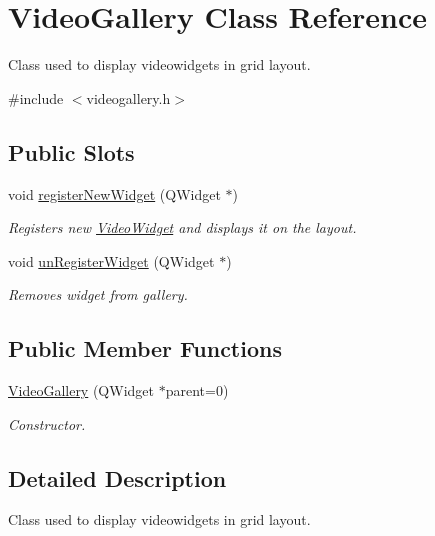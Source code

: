 \hypertarget{class_video_gallery}{
\section{VideoGallery Class Reference}
\label{dc/d09/class_video_gallery}
}


Class used to display videowidgets in grid layout.  




{\ttfamily \#include $<$videogallery.h$>$}

\subsection*{Public Slots}
\begin{DoxyCompactItemize}
\item 
void \hyperlink{class_video_gallery_ad25f124c9bf433bdaa104f9638c59399}{registerNewWidget} (QWidget $\ast$)
\begin{DoxyCompactList}\small\item\em Registers new \hyperlink{class_video_widget}{VideoWidget} and displays it on the layout. \item\end{DoxyCompactList}\item 
void \hyperlink{class_video_gallery_a1be90e78200e971b1b357aa342c23b3e}{unRegisterWidget} (QWidget $\ast$)
\begin{DoxyCompactList}\small\item\em Removes widget from gallery. \item\end{DoxyCompactList}\end{DoxyCompactItemize}
\subsection*{Public Member Functions}
\begin{DoxyCompactItemize}
\item 
\hyperlink{class_video_gallery_aa20be933d1bfef5e9533ea255afc8142}{VideoGallery} (QWidget $\ast$parent=0)
\begin{DoxyCompactList}\small\item\em Constructor. \item\end{DoxyCompactList}\end{DoxyCompactItemize}


\subsection{Detailed Description}
Class used to display videowidgets in grid layout. 


